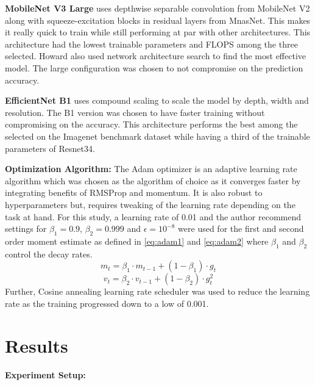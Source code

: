 \documentclass[10pt,twocolumn,letterpaper]{article}
\begin{document}
\textbf{MobileNet V3 Large} uses depthwise separable convolution from MobileNet V2 along with 
squeeze-excitation blocks in residual layers 
from MnasNet. This makes it really quick to train while still performing 
at par with other architectures. This architecture had the lowest trainable parameters and FLOPS 
among the three selected. Howard \etal \cite{howard2019searching} also used 
network architecture search to find the most effective model. The large configuration 
was chosen to not compromise on the prediction accuracy.

\textbf{EfficientNet B1} uses compound scaling to scale the model by depth, width and 
resolution. The B1 version was chosen to have faster training without compromising on the 
accuracy. \cite{tan2019efficientnet} This architecture performs the best among the selected 
on the Imagenet benchmark dataset while having a third of the trainable parameters of Resnet34.

\textbf{Optimization Algorithm:}
The Adam optimizer \cite{kingma2014adam} is an adaptive learning rate algorithm which 
was chosen as the algorithm of choice as it converges faster by integrating benefits of  
RMSProp and momentum. It is also robust to hyperparameters but, 
requires tweaking of the learning rate depending on the task at hand. For this study, 
a learning rate of 0.01 and the author recommend settings for $\beta_{1} =
0.9$, $\beta_{2} = 0.999$ and $\epsilon = 10^{-8}$ were used for the first and second order moment estimate 
as defined in \cref{eq:adam1} and \cref{eq:adam2} where $\beta_{1}$ and $\beta_{2}$ control the decay rates.
\begin{equation}
m_{t} = \beta_{1} \cdot m_{t-1} + (1 - \beta_{1}) \cdot g_{t}
\label{eq:adam1}
\end{equation}
\begin{equation}
  v_{t} = \beta_{2} \cdot v_{t-1} + (1 - \beta_{2}) \cdot g_{t}^{2}
  \label{eq:adam2}
  \end{equation}
Further, Cosine annealing \cite{loshchilov2016sgdr} learning rate scheduler was used 
to reduce the learning rate as the training progressed down to a low of 0.001. 

\section{Results} 
\label{sec:result}
\textbf{Experiment Setup:}
\end{document}
